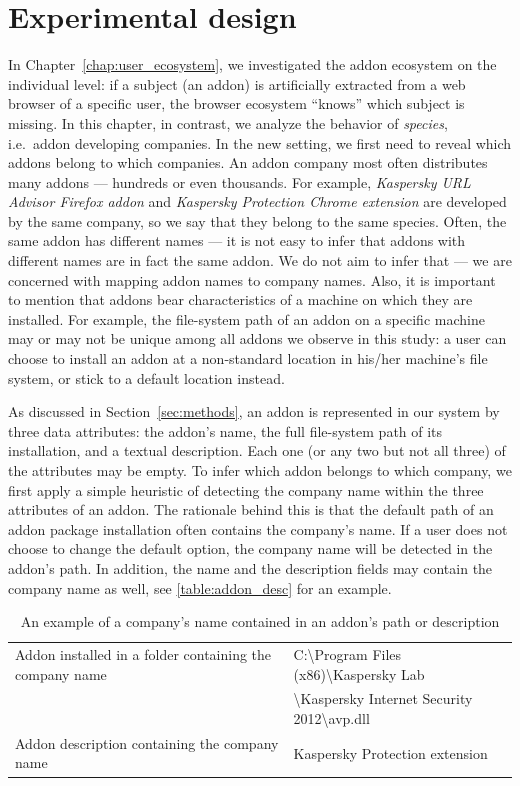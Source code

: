 \documentclass[11pt,oneside]{book}
\let\Oldsection\section
\renewcommand{\section}{\FloatBarrier\Oldsection}
\begin{document}
\section{Experimental design}

In Chapter~\autoref{chap:user_ecosystem}, we investigated the addon ecosystem on the individual level: if a subject (an addon) is artificially extracted from a web browser of a specific user, the browser ecosystem ``knows'' which subject is missing. In this chapter, in contrast, we analyze the behavior of \emph{species}, i.e.~addon developing companies. In the new setting, we first need to reveal which addons belong to which companies. An addon company most often distributes many addons --- hundreds or even thousands. For example, \emph{Kaspersky URL Advisor Firefox addon} and \emph{Kaspersky Protection Chrome extension} are developed by the same company, so we say that they belong to the same species. Often, the same addon has different names --- it is not easy to infer that addons with different names are in fact the same addon. We do not aim to infer that --- we are concerned with mapping addon names to company names. Also, it is important to mention that addons bear characteristics of a machine on which they are installed. For example, the file-system path of an addon on a specific machine may or may not be unique among all addons we observe in this study: a user can choose to install an addon at a non-standard location in his/her machine's file system, or stick to a default location instead.

As discussed in Section~\ref{sec:methods}, an addon is represented in our system by three data attributes: the addon's name, the full file-system path of its installation, and a textual description. Each one (or any two but not all three) of the attributes may be empty. To infer which addon belongs to which company, we first apply a simple heuristic of detecting the company name within the three attributes of an addon. The rationale behind this is that the default path of an addon package installation often contains the company's name. If a user does not choose to change the default option, the company name will be detected in the addon's path. In addition, the name and the description fields may contain the company name as well, see \autoref{table:addon_desc} for an example.

\begin{table}[h]
\centering
\caption{An example of a company's name contained in an addon's path or description}
\label{table:addon_desc}
\begin{tabular}{@{}|l|l|@{}}
\toprule
Addon installed in a folder containing the company name & C:\textbackslash{Program Files (x86)}\textbackslash{Kaspersky Lab}\\ & \textbackslash{Kaspersky Internet Security 2012}\textbackslash{avp.dll} \\ \midrule
Addon description containing the company name & Kaspersky Protection extension \\ \bottomrule
\end{tabular}
\end{table}
\end{document}
